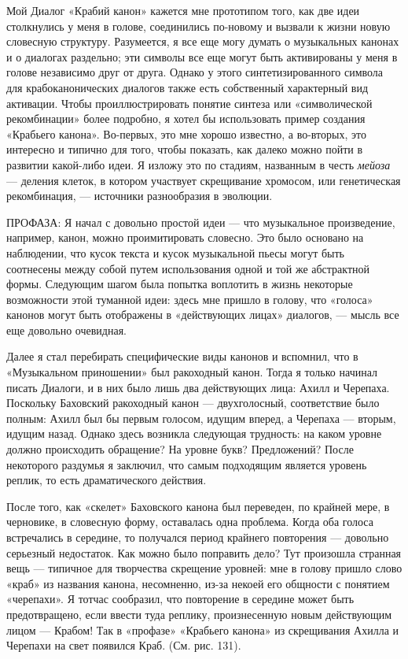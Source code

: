 \documentclass[../main.tex]{subfiles}
\begin{document}
Мой Диалог «Крабий канон» кажется мне прототипом того, как две идеи столкнулись у меня в голове, соединились по-новому и вызвали к жизни новую словесную структуру. Разумеется, я все еще могу думать о музыкальных канонах и о диалогах раздельно; эти символы все еще могут быть активированы у меня в голове независимо друг от друга. Однако у этого синтетизированного символа для крабоканонических диалогов также есть собственный характерный вид активации. Чтобы проиллюстрировать понятие синтеза или «символической рекомбинации» более подробно, я хотел бы использовать пример создания «Крабьего канона». Во-первых, это мне хорошо известно, а во-вторых, это интересно и типично для того, чтобы показать, как далеко можно пойти в развитии какой-либо идеи. Я изложу это по стадиям, названным в честь \emph{мейоза} --- деления клеток, в котором участвует скрещивание хромосом, или генетическая рекомбинация, --- источники разнообразия в эволюции.

ПРОФАЗА: Я начал с довольно простой идеи --- что музыкальное произведение, например, канон, можно проимитировать словесно. Это было основано на наблюдении, что кусок текста и кусок музыкальной пьесы могут быть соотнесены между собой путем использования одной и той же абстрактной формы. Следующим шагом была попытка воплотить в жизнь некоторые возможности этой туманной идеи: здесь мне пришло в голову, что «голоса» канонов могут быть отображены в «действующих лицах» диалогов, --- мысль все еще довольно очевидная.

Далее я стал перебирать специфические виды канонов и вспомнил, что в «Музыкальном приношении» был ракоходный канон. Тогда я только начинал писать Диалоги, и в них было лишь два действующих лица: Ахилл и Черепаха. Поскольку Баховский ракоходный канон --- двухголосный, соответствие было полным: Ахилл был бы первым голосом, идущим вперед, а Черепаха --- вторым, идущим назад. Однако здесь возникла следующая трудность: на каком уровне должно происходить обращение? На уровне букв? Предложений? После некоторого раздумья я заключил, что самым подходящим является уровень реплик, то есть драматического действия.

После того, как «скелет» Баховского канона был переведен, по крайней мере, в черновике, в словесную форму, оставалась одна проблема. Когда оба голоса встречались в середине, то получался период крайнего повторения --- довольно серьезный недостаток. Как можно было поправить дело? Тут произошла странная вещь --- типичное для творчества скрещение уровней: мне в голову пришло слово «краб» из названия канона, несомненно, из-за некоей его общности с понятием «черепахи». Я тотчас сообразил, что повторение в середине может быть предотвращено, если ввести туда реплику, произнесенную новым действующим лицом --- Крабом! Так в «профазе» «Крабьего канона» из скрещивания Ахилла и Черепахи на свет появился Краб. (См. рис. 131).
\end{document}
